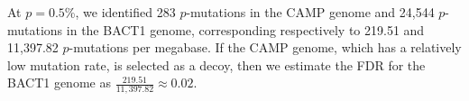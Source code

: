 At $p=0.5$\%, we identified 283 $p$-mutations in the CAMP genome and 24,544 $p$-mutations in the BACT1 genome, corresponding respectively to 219.51 and 11,397.82 $p$-mutations per megabase. If the CAMP genome, which has a relatively low mutation rate, is selected as a decoy, then we estimate the FDR for the BACT1 genome as $\frac{219.51}{11,397.82} \approx 0.02$.\endinput